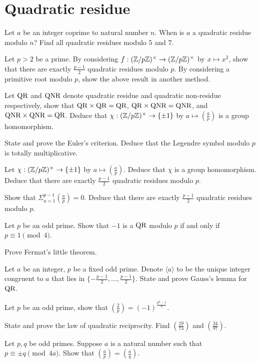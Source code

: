 \section{Quadratic residue}
\begin{question}{9}
    Let $a$ be an integer coprime to natural number $n$. When is $a$ a quadratic residue modulo $n$? Find all quadratic residues modulo $5$ and $7$.

    Let $p > 2$ be a prime. By considering $f : (\mathbb{Z}/p\mathbb{Z})^\times \rightarrow (\mathbb{Z}/p\mathbb{Z})^\times$ by $x \mapsto x^2$, show that there are exactly $\frac{p-1}{2}$ quadratic residues modulo $p$. By considering a primitive root modulo $p$, show the above result in another method.

    Let $\text{QR}$ and $\text{QNR}$ denote quadratic residue and quadratic non-residue respectively, show that $\text{QR} \times \text{QR} = \text{QR}$, $\text{QR} \times \text{QNR} = \text{QNR}$, and $\text{QNR} \times \text{QNR} = \text{QR}$. Deduce that $\chi :(\mathbb{Z}/p\mathbb{Z})^\times \rightarrow \{\pm1\}$ by $a \mapsto (\frac{a}{p})$ is a group homomorphism.
\end{question}

\begin{question}{10}
    State and prove the Euler's criterion. Deduce that the Legendre symbol modulo $p$ is totally multiplicative. 

    Let $\chi :(\mathbb{Z}/p\mathbb{Z})^\times \rightarrow \{\pm1\}$ by $a \mapsto (\frac{a}{p})$. Deduce that $\chi$ is a group homomorphism. Deduce that there are exactly $\frac{p-1}{2}$ quadratic residues modulo $p$.

    Show that $\Sigma_{a=1}^{p-1}(\frac{a}{p}) = 0$. Deduce that there are exactly $\frac{p-1}{2}$ quadratic residues modulo $p$.

    Let $p$ be an odd prime. Show that $-1$ is a $\text{QR}$ modulo $p$ if and only if $p \equiv 1 \pmod{4}$.
\end{question}

\begin{question}{11}
    Prove Fermat's little theorem.

    Let $a$ be an integer, $p$ be a fixed odd prime. Denote $\langle a \rangle$ to be the unique integer congruent to $a$ that lies in $\{-\frac{p-1}{2},\dots,\frac{p-1}{2}\}$. State and prove Gauss's lemma for $\text{QR}$.

    Let $p$ be an odd prime, show that $(\frac{2}{p}) = (-1)^{\frac{p^2-1}{8}}$.
\end{question}

\begin{question}{12}
    State and prove the law of quadratic reciprocity. Find $(\frac{19}{73})$ and $(\frac{34}{97})$.

    Let $p,q$ be odd primes. Suppose $a$ is a natural number such that $p \equiv \pm q \pmod{4a}$. Show that $(\frac{a}{p}) = (\frac{a}{q})$.
\end{question}

